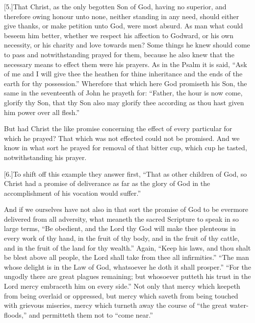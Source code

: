 [5.]That Christ, as the only begotten Son of God, having no superior, and therefore owing honour unto none, neither standing in any need, should either give thanks, or make petition unto God, were most absurd. As man what could beseem him better, whether we respect his affection to Godward, or his own necessity, or his charity and love towards men? Some things he knew should come to pass and notwithstanding prayed for them, because he also knew that the necessary means to effect them were his prayers. As in the Psalm it is said, “Ask of me and I will give thee the heathen for thine inheritance and the ends of the earth for thy possession.” Wherefore that which here God promiseth his Son, the same in the seventeenth of John he prayeth for: “Father, the hour is now come, glorify thy Son, that thy Son also may glorify thee according as thou hast given him power over all flesh.”

But had Christ the like promise concerning the effect of every particular for which he prayed? That which was not effected could not be promised. And we know in what sort he prayed for removal of that bitter cup, which cup he tasted, notwithstanding his prayer.

[6.]To shift off this example they answer first, “That  as other children of God, so Christ had a promise of deliverance as far as the glory of God in the accomplishment of his vocation would suffer.”

And if we ourselves have not also in that sort the promise of God to be evermore delivered from all adversity, what meaneth the sacred Scripture to speak in so large terms, “Be obedient, and the Lord thy God will make thee plenteous in every work of thy hand, in the fruit of thy body, and in the fruit of thy cattle, and in the fruit of the land for thy wealth.” Again, “Keep his laws, and thou shalt be blest above all people, the Lord shall take from thee all infirmities.” “The man whose delight is in the Law of God, whatsoever he doth it shall prosper.” “For the ungodly there are great plagues remaining; but whosoever putteth his trust in the Lord mercy embraceth him on every side.” Not only that mercy which keepeth from being overlaid or oppressed, but mercy which saveth from being touched with grievous miseries, mercy which turneth away the course of “the great water-floods,” and permitteth them not to “come near.”

